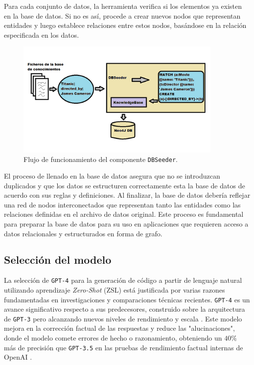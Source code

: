 Para cada conjunto de datos, la herramienta verifica si los elementos ya existen en la base de datos. Si no es así, procede a crear nuevos nodos que representan entidades y luego establece relaciones entre estos nodos, basándose en la relación especificada en los datos.

\begin{figure}[H]\label{dbseeder}
	\centering
	\includegraphics[width = 0.9\textwidth]{./Graphics/dbseeder}
	\caption{Flujo de funcionamiento del componente \texttt{DBSeeder}.}
\end{figure}

El proceso de llenado en la base de datos asegura que no se introduzcan duplicados y que los datos se estructuren correctamente esta la base de datos de acuerdo con sus reglas y definiciones. Al finalizar, la base de datos debería reflejar una red de nodos interconectados que representan tanto las entidades como las relaciones definidas en el archivo de datos original. Este proceso es fundamental para preparar la base de datos para su uso en aplicaciones que requieren acceso a datos relacionales y estructurados en forma de grafo.

\subsection{Selección del modelo} \label{model_selection}

La selección de \texttt{GPT-4} para la generación de código a partir de lenguaje natural utilizando aprendizaje \textit{Zero-Shot} (ZSL) está justificada por varias razones fundamentadas en investigaciones y comparaciones técnicas recientes.  \texttt{GPT-4} es un avance significativo respecto a sus predecesores, construido sobre la arquitectura de  \texttt{GPT-3} pero alcanzando nuevos niveles de rendimiento y escala \cite{}. Este modelo mejora en la corrección factual de las respuestas y reduce las "alucinaciones", donde el modelo comete errores de hecho o razonamiento, obteniendo un $40\%$ más de precisión que  \texttt{GPT-3.5} en las pruebas de rendimiento factual internas de OpenAI \cite{}.

